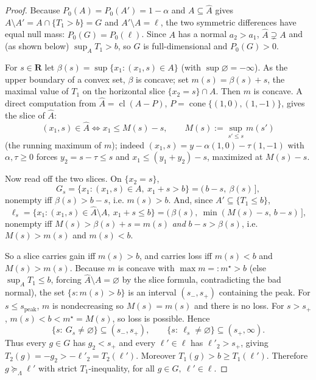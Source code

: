 \documentclass[12pt]{article}
\theoremstyle{remark}
\newcommand{\Lam}{\Lambda}
\newcommand{\R}{\mathbf R}
\newcommand{\sucL}{\succeq_\Lam}
\DeclareMathOperator{\cl}{cl}
\DeclareMathOperator{\cone}{cone}
\newcommand{\hA}{\widehat A}
\begin{document}
\begin{proof}
Because $P_0(A)=P_0(A')=1-\alpha$ and $A\subseteq\hA$ gives $A\setminus A'=A\cap\{T_1>b\}=G$ and $A'\setminus A=\ell$, the two symmetric differences have equal null mass: $P_0(G)=P_0(\ell)$. Since $A$ has a normal $a_2>a_1$, $\hA\supsetneq A$ and (as shown below) $\sup_{A}T_1>b$, so $G$ is full-dimensional and $P_0(G)>0$.

For $s\in\R$ let $\beta(s)=\sup\{x_1:(x_1,s)\in A\}$ (with $\sup\varnothing=-\infty$). As the upper boundary of a convex set, $\beta$ is concave; set $m(s)=\beta(s)+s$, the maximal value of $T_1$ on the horizontal slice $\{x_2=s\}\cap A$. Then $m$ is concave. A direct computation from $\hA=\cl(A-P)$, $P=\cone\{(1,0),(1,-1)\}$, gives the slice of $\hA$:
\[
(x_1,s)\in\hA \iff x_1\le M(s)-s,\qquad M(s):=\sup_{s'\le s}m(s')
\]
(the running maximum of $m$); indeed $(x_1,s)=y-\alpha(1,0)-\tau(1,-1)$ with $\alpha,\tau\ge0$ forces $y_2=s-\tau\le s$ and $x_1\le (y_1+y_2)-s$, maximized at $M(s)-s$.

Now read off the two slices. On $\{x_2=s\}$,
\[
G_s=\{x_1:(x_1,s)\in A,\ x_1+s>b\}=(\,b-s,\ \beta(s)\,],
\]
nonempty iff $\beta(s)>b-s$, i.e. $m(s)>b$. And, since $A'\subseteq\{T_1\le b\}$,
\[
\ell_s=\{x_1:(x_1,s)\in\hA\setminus A,\ x_1+s\le b\}=(\,\beta(s),\ \min(M(s)-s,\,b-s)\,],
\]
nonempty iff $M(s)>\beta(s)+s=m(s)$ \emph{and} $b-s>\beta(s)$, i.e. $M(s)>m(s)$ and $m(s)<b$.

So a slice carries gain iff $m(s)>b$, and carries loss iff $m(s)<b$ and $M(s)>m(s)$. Because $m$ is concave with $\max m=:m^\star>b$ (else $\sup_A T_1\le b$, forcing $\hA\setminus A=\varnothing$ by the slice formula, contradicting the bad normal), the set $\{s:m(s)>b\}$ is an interval $(s_-,s_+)$ containing the peak. For $s\le s_{\mathrm{peak}}$, $m$ is nondecreasing so $M(s)=m(s)$ and there is no loss. For $s>s_+$, $m(s)<b<m^\star=M(s)$, so loss is possible. Hence
\[
\{s:\ G_s\ne\varnothing\}\subseteq(s_-,s_+),\qquad
\{s:\ \ell_s\ne\varnothing\}\subseteq(s_+,\infty).
\]
Thus every $g\in G$ has $g_2<s_+$ and every $\ell'\in\ell$ has $\ell'_2>s_+$, giving $T_2(g)=-g_2>-\ell'_2=T_2(\ell')$. Moreover $T_1(g)>b\ge T_1(\ell')$. Therefore $g\sucL\ell'$ with strict $T_1$-inequality, for all $g\in G,\ \ell'\in\ell$.
\end{proof}
\end{document}
